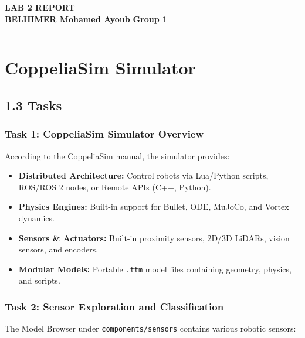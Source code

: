 \documentclass[11pt,a4paper]{article}
\begin{document}
\begin{center}
  {\LARGE \textbf{\color{primary}LAB 2 REPORT}}\\[0.25cm]
  {\large \textbf{BELHIMER Mohamed Ayoub} \quad \textbullet \quad \textbf{Group 1}}\\[0.25cm]
  \rule{\linewidth}{0.8pt}
\end{center}
\vspace{-0.1cm}

\section{CoppeliaSim Simulator}
\subsection*{1.3 Tasks}

\subsubsection*{Task 1: CoppeliaSim Simulator Overview}
According to the CoppeliaSim manual, the simulator provides:
\begin{itemize}
  \item \textbf{Distributed Architecture:} Control robots via Lua/Python scripts, ROS/ROS 2 nodes, or Remote APIs (C++, Python).
  \item \textbf{Physics Engines:} Built-in support for Bullet, ODE, MuJoCo, and Vortex dynamics.
  \item \textbf{Sensors \& Actuators:} Built-in proximity sensors, 2D/3D LiDARs, vision sensors, and encoders.
  \item \textbf{Modular Models:} Portable \texttt{.ttm} model files containing geometry, physics, and scripts.
\end{itemize}

\subsubsection*{Task 2: Sensor Exploration and Classification}
The Model Browser under \texttt{components/sensors} contains various robotic sensors:
\end{document}

